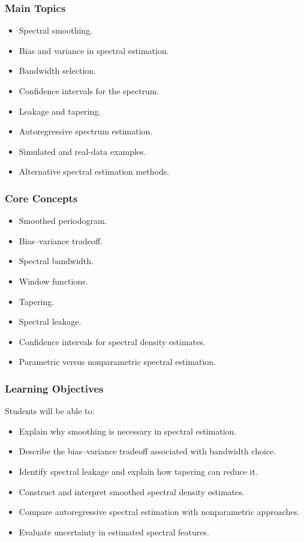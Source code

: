 \documentclass[11pt]{article}
\begin{document}
\subsubsection*{Main Topics}
\begin{itemize}
    \item Spectral smoothing.
    \item Bias and variance in spectral estimation.
    \item Bandwidth selection.
    \item Confidence intervals for the spectrum.
    \item Leakage and tapering.
    \item Autoregressive spectrum estimation.
    \item Simulated and real-data examples.
    \item Alternative spectral estimation methods.
\end{itemize}

\subsubsection*{Core Concepts}
\begin{itemize}
    \item Smoothed periodogram.
    \item Bias--variance tradeoff.
    \item Spectral bandwidth.
    \item Window functions.
    \item Tapering.
    \item Spectral leakage.
    \item Confidence intervals for spectral density estimates.
    \item Parametric versus nonparametric spectral estimation.
\end{itemize}

\subsubsection*{Learning Objectives}
Students will be able to:
\begin{itemize}
    \item Explain why smoothing is necessary in spectral estimation.
    \item Describe the bias--variance tradeoff associated with bandwidth choice.
    \item Identify spectral leakage and explain how tapering can reduce it.
    \item Construct and interpret smoothed spectral density estimates.
    \item Compare autoregressive spectral estimation with nonparametric approaches.
    \item Evaluate uncertainty in estimated spectral features.
\end{itemize}
\end{document}
